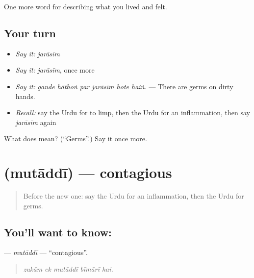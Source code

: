 \begin{grammarlens}[title={What you've built}]
One more word for describing what you lived and felt.
\end{grammarlens}

\subsection*{Your turn}
\begin{itemize}
\raggedright
  \item \emph{Say it:} \emph{jarāsīm}
  \item \emph{Say it:} \emph{jarāsīm}, once more
  \item \emph{Say it:} \emph{gande hāthoṅ par jarāsīm hote haiṅ.} — There are germs on dirty hands.
  \item \emph{Recall:} say the Urdu for to limp, then the Urdu for an inflammation, then say \emph{jarāsīm} again
\end{itemize}

\begin{tcolorbox}[breakable,colback=teal!4,colframe=teal!35!black,title={Before you move on}]
What does  mean? (\textquotedblleft{}Germs\textquotedblright{}.) Say it once more.
\end{tcolorbox}
\section[\texorpdfstring{\ur{متعدی} (mutāddī)}{متعدی (mutāddī)}]{ (mutāddī) — contagious}

\label{lesson:UR-C474-mutaddi}



\begin{quote}
Before the new one: say the Urdu for an inflammation, then the Urdu for germs.
\end{quote}

\subsection*{You'll want to know: }
\textbf{} — \emph{mutāddī} — \textquotedblleft{}contagious\textquotedblright{}.

\begin{quote}
    
\end{quote}

\begin{quote}
\emph{zukām ek mutāddī bīmārī hai.}
\end{quote}


